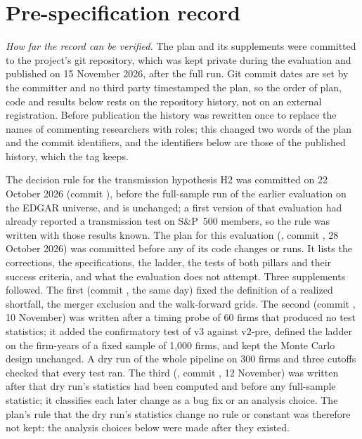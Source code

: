 \section{Pre-specification record}\label{app:prespec}
\emph{How far the record can be verified.} The plan and its supplements were committed to the project's git repository, which was kept private during the evaluation and published on 15 November 2026, after the full run. Git commit dates are set by the committer and no third party timestamped the plan, so the order of plan, code and results below rests on the repository history, not on an external registration. Before publication the history was rewritten once to replace the names of commenting researchers with roles; this changed two words of the plan and the commit identifiers, and the identifiers below are those of the published history, which the tag  keeps.

The decision rule for the transmission hypothesis H2 was committed on 22 October 2026 (commit ), before the full-sample run of the earlier evaluation \selfcitep{} on the EDGAR universe, and is unchanged; a first version of that evaluation had already reported a transmission test on S\&P~500 members, so the rule was written with those results known. The plan for this evaluation (, commit , 28 October 2026) was committed before any of its code changes or runs. It lists the corrections, the specifications, the ladder, the tests of both pillars and their success criteria, and what the evaluation does not attempt. Three supplements followed. The first (commit , the same day) fixed the definition of a realized shortfall, the merger exclusion and the walk-forward grids. The second (commit , 10 November) was written after a timing probe of 60 firms that produced no test statistics; it added the confirmatory test of v3 against v2-pre, defined the ladder on the firm-years of a fixed sample of 1{,}000 firms, and kept the Monte Carlo design unchanged. A dry run of the whole pipeline on 300 firms and three cutoffs checked that every test ran. The third (, commit , 12 November) was written after that dry run's statistics had been computed and before any full-sample statistic; it classifies each later change as a bug fix or an analysis choice. The plan's rule that the dry run's statistics change no rule or constant was therefore not kept: the analysis choices below were made after they existed.

